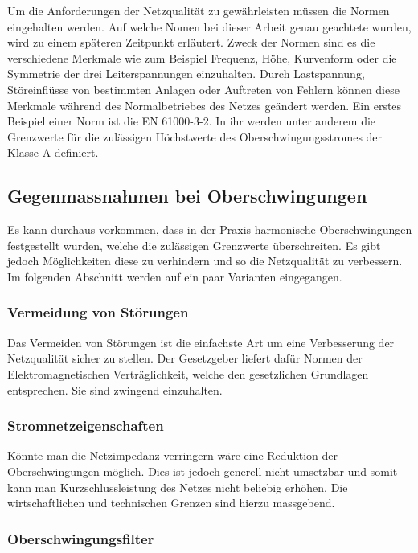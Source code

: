Um die Anforderungen der Netzqualität zu gewährleisten müssen die Normen eingehalten werden. Auf welche Nomen bei dieser Arbeit genau geachtete wurden, wird zu einem späteren Zeitpunkt erläutert. Zweck der Normen sind es  die verschiedene Merkmale wie zum Beispiel Frequenz, Höhe, Kurvenform oder die Symmetrie der drei Leiterspannungen einzuhalten. Durch Lastspannung, Störeinflüsse von bestimmten Anlagen oder Auftreten von Fehlern können diese Merkmale während des Normalbetriebes des Netzes geändert werden. Ein erstes Beispiel einer Norm ist die EN 61000-3-2. In ihr werden unter anderem die Grenzwerte für die zulässigen Höchstwerte des Oberschwingungsstromes der Klasse A definiert.



\subsection{Gegenmassnahmen bei Oberschwingungen}

Es kann durchaus vorkommen, dass in der Praxis harmonische Oberschwingungen festgestellt wurden, welche die zulässigen Grenzwerte überschreiten. Es gibt jedoch Möglichkeiten diese zu verhindern und so die Netzqualität zu verbessern. Im folgenden Abschnitt werden auf ein paar Varianten eingegangen.

\subsubsection{Vermeidung von Störungen}
Das Vermeiden von Störungen ist die einfachste Art um eine Verbesserung der Netzqualität sicher zu stellen. Der Gesetzgeber liefert dafür Normen der Elektromagnetischen Verträglichkeit, welche den gesetzlichen Grundlagen entsprechen. Sie sind zwingend einzuhalten.
\subsubsection{Stromnetzeigenschaften}
Könnte man die Netzimpedanz verringern wäre eine Reduktion der Oberschwingungen möglich. Dies ist jedoch generell nicht umsetzbar und somit kann man Kurzschlussleistung des Netzes nicht beliebig erhöhen. Die wirtschaftlichen und technischen Grenzen sind hierzu massgebend.  


\subsubsection{Oberschwingungsfilter}

